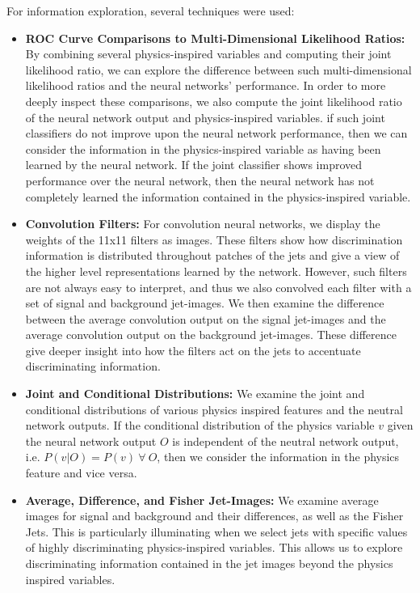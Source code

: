 For information exploration, several techniques were used:
\begin{itemize}

\item \textbf{ROC Curve Comparisons to Multi-Dimensional Likelihood Ratios:}  By combining several physics-inspired variables and computing their joint likelihood ratio, we can explore the difference between such multi-dimensional likelihood ratios and the neural networks' performance.  In order to more deeply inspect these comparisons, we also compute the joint likelihood ratio of the neural network output and physics-inspired variables.  if such joint classifiers do not improve upon the neural network performance, then we can consider the information in the physics-inspired variable as having been learned by the neural network.  If the joint classifier shows improved performance over the neural network, then the neural network has not completely learned the information contained in the physics-inspired variable.

\item \textbf{Convolution Filters:}  For convolution neural networks, we display the weights of the 11x11 filters as images.  These filters show how discrimination information is distributed throughout patches of the jets and give a view of the higher level representations learned by the network.  However, such filters are not always easy to interpret, and thus we also convolved each filter with a set of signal and background jet-images.  We then examine the difference between the average convolution output on the signal jet-images and the average convolution output on the background jet-images.  These difference give deeper insight into how the filters act on the jets to accentuate discriminating information.

\item \textbf{Joint and Conditional Distributions:}  We examine the joint and conditional distributions of various physics inspired features and the neutral network outputs.  If the conditional distribution of the physics variable $v$ given the neural network output $O$ is independent of the neutral network output, i.e. $P(v|O) = P(v)\ \forall\ O$, then we consider the information in the physics feature and vice versa.

\item \textbf{Average, Difference, and Fisher Jet-Images:}  We examine average images for signal and background and their differences, as well as the Fisher Jets.  This is particularly illuminating when we select jets with specific values of highly discriminating physics-inspired variables.  This allows us to explore discriminating information contained in the jet images beyond the physics inspired variables.


\end{itemize}
